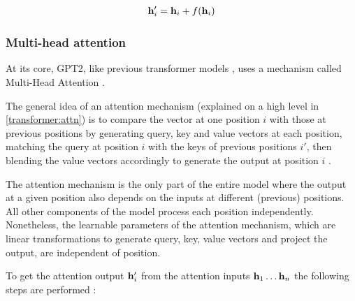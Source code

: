 \begin{align}
	{\mathbf{h}}'_i = {\mathbf{h}}_i + f({\mathbf{h}}_i)
	\label{eq:gpt2_res}
\end{align}


\subsubsection{Multi-head attention}
\label{gpt2:attn}

At its core, GPT2, like previous transformer models , uses a mechanism called Multi-Head Attention .

The general idea of an attention mechanism (explained on a high level in \cref{transformer:attn}) is to compare the vector at one position $i$ with those at previous positions by generating query, key and value vectors at each position, matching the query at position $i$ with the keys of previous positions $i'$, then blending the value vectors accordingly to generate the output at position $i$ \cite{alammar-transformer} \cite{alammar-gpt2}.

The attention mechanism is the only part of the entire model where the output at a given position also depends on the inputs at different (previous) positions. All other components of the model process each position independently.
Nonetheless, the learnable parameters of the attention mechanism, which are linear transformations to generate query, key, value vectors and project the output, are independent of position.

To get the attention output ${\mathbf{h}}'_i$ from the attention inputs ${\mathbf{h}}_1 \ldots {\mathbf{h}}_n$ the following steps are performed  \cite{alammar-transformer} \cite{alammar-gpt2}:

